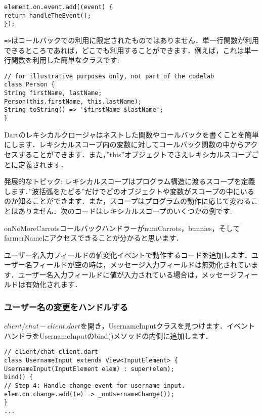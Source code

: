 \begin{verbatim}
element.on.event.add((event) {
return handleTheEvent();
});
\end{verbatim}

\verb|=>|はコールバックでの利用に限定されたものではありません．単一行関数が利用できるところであれば，どこでも利用することができます．例えば，これは単一行関数を利用した簡単なクラスです:

\begin{verbatim}
// for illustrative purposes only, not part of the codelab
class Person {
String firstName, lastName;
Person(this.firstName, this.lastName);
String toString() => '$firstName $lastName';
}
\end{verbatim}

Dartのレキシカルクロージャはネストした関数やコールバックを書くことを簡単にします．レキシカルスコープ内の変数に対してコールバック関数の中からアクセスすることができます．また，''this''オブジェクトでさえレキシカルスコープごとに定義されます．

発展的なトピック: レキシカルスコープはプログラム構造に渡るスコープを定義します．''波括弧をたどる''だけでどのオブジェクトや変数がスコープの中にいるのか知ることができます．また，スコープはプログラムの動作に応じて変わることはありません．次のコードはレキシカルスコープのいくつかの例です:


onNoMoreCarrotsコールバックハンドラーがnumCarrots，bunnies，そしてfarmerNameにアクセスできることが分かると思います．

ユーザー名入力フィールドの値変化イベントで動作するコードを追加します．ユーザー名フィールドが空の時は，メッセージ入力フィールドは無効化されています．ユーザー名入力フィールドに値が入力されている場合は，メッセージフィールドは有効化されます．

\subsubsection{ユーザー名の変更をハンドルする}

$ client/chat-client.dart $を開き，UsernameInputクラスを見つけます．イベントハンドラをUsernameInputのbind()メソッドの内側に追加します．

\begin{verbatim}
// client/chat-client.dart
class UsernameInput extends View<InputElement> {
UsernameInput(InputElement elem) : super(elem);
bind() {
// Step 4: Handle change event for username input.
elem.on.change.add((e) => _onUsernameChange());
}
...
\end{verbatim}

